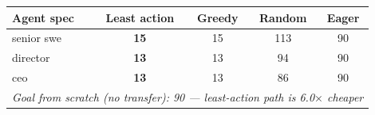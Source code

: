 \begin{tabular}{lcccc}
\toprule
Agent spec & Least action & Greedy & Random & Eager \\
\midrule
senior swe & \textbf{15} & 15 & 113 & 90 \\
director & \textbf{13} & 13 & 94 & 90 \\
ceo & \textbf{13} & 13 & 86 & 90 \\
\midrule
\multicolumn{5}{l}{\emph{Goal from scratch (no transfer): 90 — least-action path is 6.0$\times$ cheaper}} \\
\bottomrule
\end{tabular}
